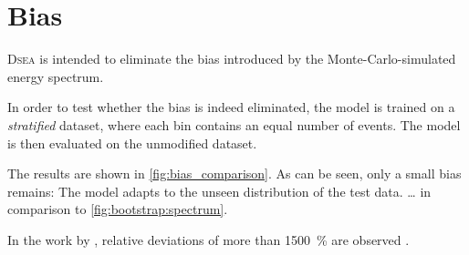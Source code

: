 \section{Bias}
\textsc{Dsea} is intended to eliminate the bias introduced by the Monte-Carlo-simulated energy spectrum.

In order to test
whether the bias is indeed eliminated,
the model is trained on a \emph{stratified} dataset,
where each bin contains an equal number of events.
The model is then evaluated on the unmodified dataset.

The results are shown in \autoref{fig:bias_comparison}.
As can be seen,
only a small bias remains:
The model adapts to the unseen distribution of the test data.
… in comparison to \autoref{fig:bootstrap:spectrum}.

In the work by \citeauthor{dsea_samuel},
relative deviations of more than \SI{1500}{\percent} are observed \cite{dsea_samuel}.


